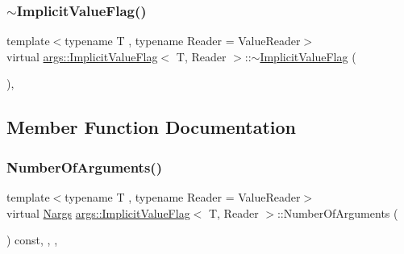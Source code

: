 \mbox{\label{classargs_1_1_implicit_value_flag_ac075d9514ac7d6907d2f26fd2fa078e2}} 
\subsubsection{\texorpdfstring{$\sim$\+Implicit\+Value\+Flag()}{~ImplicitValueFlag()}}
{\footnotesize\ttfamily template$<$typename T , typename Reader  = Value\+Reader$>$ \\
virtual \hyperlink{classargs_1_1_implicit_value_flag}{args\+::\+Implicit\+Value\+Flag}$<$ T, Reader $>$\+::$\sim$\hyperlink{classargs_1_1_implicit_value_flag}{Implicit\+Value\+Flag} (\begin{DoxyParamCaption}{ }\end{DoxyParamCaption})\hspace{0.3cm}{\ttfamily [inline]}, {\ttfamily [virtual]}}



\subsection{Member Function Documentation}
\mbox{\label{classargs_1_1_implicit_value_flag_a7cfc67aca2b32921e722f51d349df2c5}} 
\subsubsection{\texorpdfstring{Number\+Of\+Arguments()}{NumberOfArguments()}}
{\footnotesize\ttfamily template$<$typename T , typename Reader  = Value\+Reader$>$ \\
virtual \hyperlink{structargs_1_1_nargs}{Nargs} \hyperlink{classargs_1_1_implicit_value_flag}{args\+::\+Implicit\+Value\+Flag}$<$ T, Reader $>$\+::Number\+Of\+Arguments (\begin{DoxyParamCaption}{ }\end{DoxyParamCaption}) const\hspace{0.3cm}{\ttfamily [inline]}, {\ttfamily [override]}, {\ttfamily [virtual]}, {\ttfamily [noexcept]}}

